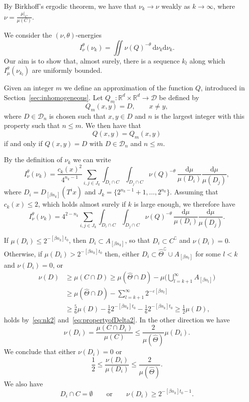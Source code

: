 \documentclass[AHL,Unicode,longabstracts]{cedram}
\newcommand*{\dd}{\mathrm{d}}
\begin{document}
By Birkhoff's ergodic theorem, we have that $\nu_k \to \nu$ weakly as $k \to \infty$, where $\nu = \frac{\mu|_C}{\mu (C)}$.

We consider the $(\nu, \theta)$-energies
\[
I_\nu^\theta (\nu_k) = \iint \nu (Q)^{-\theta} \, \dd \nu_k
\dd \nu_k.
\]
Our aim is to show that, almost surely, there is a sequence $k_l$ along which $I_\mu^\theta (\nu_{k_l})$ are uniformly bounded.

Given an integer $m$ we define an approximation of the function $Q$, introduced in Section~\ref{sec:inhomogeneous}. Let $Q_m \colon
\mathbb{R}^d \times \mathbb{R}^d \to \mathscr{D}$ be defined by
\[
Q_m (x,y) = D, \qquad x \neq y,
\]
where $D \in \mathscr{D}_n$ is chosen such that $x,y \in D$ and $n$ is the largest integer with this property such that $n \leq m$. We then have that
\[
Q (x,y) = Q_m (x,y)
\]
if and only if $Q (x,y) = D$ with $D \in \mathscr{D}_n$ and $n \leq m$.

By the definition of $\nu_k$ we can write
\[
I_\nu^\theta (\nu_k) = \frac{c_k (x)^2} {4^{n_k-1}} \sum_{i,j \in J_k}
\int_{D_i \cap C} \int_{D_j \cap C} \nu (Q)^{-\theta} \,
\frac{\dd \mu}{\mu (D_i)} \frac{\dd \mu}{\mu (D_j)},
\]
where $D_i = D_{[\beta n_k]} (T^i x)$ and $J_k = \{2^{n_k-1} +1,
\ldots, 2^{n_k} \}$. Assuming that $c_k (x) \leq 2$, which holds almost surely if $k$ is large enough, we therefore have
\begin{equation}\label{eq:nuenergy}
I_\nu^\theta (\nu_k) = 4^{2-n_k} \sum_{i,j \in J_k}
\int_{D_i \cap C} \int_{D_j \cap C} \nu (Q)^{-\theta} \,
\frac{\dd \mu}{\mu (D_i)} \frac{\dd \mu}{\mu (D_j)}.
\end{equation}

If $\mu (D_i) \leq 2^{-[\beta n_k] t_0}$, then $D_i \subset A_{[\beta n_k]}$, so that $D_i \subset C^\complement$ and $\nu (D_i) = 0$. Otherwise, if $\mu (D_i) > 2^{-[\beta n_k] t_0}$ then, either $D_i \subset
\hat{\Theta}^\complement \cup A_{[\beta n_l]}$ for some $l < k$ and $\nu (D_i) = 0$, or
\begin{align*}
\nu (D) &\geq \mu (C \cap D) \geq \mu (\hat{\Theta} \cap D) - \mu
\biggl(\bigcup_{l = k+1}^\infty A_{[\beta n_l]} \biggr) \\ &\geq
\mu (\hat{\Theta} \cap D) - \sum_{l=k+1}^\infty 2^{-\varepsilon [\beta n_l]} \\ &\geq \frac{5}{6} \mu (D) - \frac{1}{6} 2^{-[\beta n_k] t_0} - \frac{1}{6} 2^{-[\beta n_k] t_0} \geq \frac{1}{2}
\mu (D),
\end{align*}
holds by~\eqref{eq:nk2} and~\eqref{eq:propertyofDelta2}. In the other direction we have
\[
\nu (D_i) = \frac{\mu (C \cap D_i)}{\mu (C)} \leq \frac{2}{\mu (\hat{\Theta})} \mu (D_i).
\]
We conclude that either $\nu (D_i) = 0$ or
\begin{equation}\label{eq:mu-nu-ratio}
\frac{1}{2} \leq \frac{\nu (D_i)}{\mu (D_i)} \leq \frac{2}{\mu (\hat{\Theta})}.
\end{equation}
We also have
\begin{equation}\label{eq:nuestimate}
D_i \cap C = \emptyset \qquad \text{or} \qquad \nu (D_i) \geq 2^{-[\beta n_k] t_0 - 1}.
\end{equation}
\end{document}
